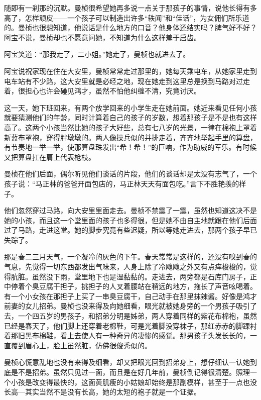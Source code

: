 \par 随即有一刹那的沉默。曼桢很希望她再多说一点关于那孩子的事情，说他长得有多高了，怎样顽皮——一个孩子可以制造出许多“轶闻”和“佳话”，为女佣们所乐道的。曼桢也很想知道，他说话是什么地方的口音？他身体还结实吗？脾气好不好？阿宝不说，曼桢却也不愿意问她，不知道为什么这样羞于启齿。
\par 阿宝笑道：“那我走了，二小姐。”她走了，曼桢也就进去了。
\par 阿宝说祝家现在住在大安里，曼桢常常走过那里的，她每天乘电车，从她家里走到电车站有不少路，这大安里就是必经之地，现在她走到这里总是换到马路对过走着，很担心也许会碰见鸿才，虽然不怕他纠缠不清，究竟讨厌。
\par 这一天，她下班回来，有两个放学回来的小学生走在她前面。她近来看见任何小孩就要猜测他们的年龄，同时计算着自己的孩子的岁数，想着那孩子是不是也有这样高了。这两个小孩当然比她的孩子大好些，总有七八岁的光景，一律在棉袍上罩着新蓝布罩袍，穿得胖墩墩的。两人像操兵似的并排走着，齐齐地举起手里的算盘，有节奏地一举一举，使那算盘珠发出“希！希！”的巨响，作为助威的军乐。有时候又把算盘扛在肩上代表枪枝。
\par 曼桢在他们后面，偶尔听见他们谈话的片段，他们的谈话却是太没有志气了，一个孩子说：“马正林的爸爸开面包店的，马正林天天有面包吃。”言下不胜艳羡的样子。
\par 他们忽然穿过马路，向大安里里面走去。曼桢不禁震了一震，虽然也知道这决不是她的小孩，而且这一个堂里面的孩子也多得很，但是她不由自主地就跟在他们后面过了马路，走进这堂。她的脚步究竟有些迟疑，所以等她走进去，那两个孩子早已失踪了。
\par 那是春二三月天气，一个凝冷的灰色的下午。春天常常是这样的，还没有嗅到春的气息，先觉得一切东西都发出气味来，人身上除了冷飕飕之外又有点痒梭梭的，觉得肮脏。虽然没下雨，堂里地下也是湿黏黏的。走进去，两旁都是石库门房子，正中停着个臭豆腐干担子，挑担子的人叉着腰站在稍远的地方，拖长了声音吆喝着。有一个小女孩在那担子上买了一串臭豆腐干，自己动手在那里抹辣酱。好像是鸿才前妻的女儿招弟。曼桢也没来得及向她细看，眼光就被她身旁的一个男孩子吸引了去，一个四五岁的男孩子，和招弟分明是姊弟，两人穿着同样的紫花布棉袍，虽然已经是春天了，他们脚上还穿着老棉鞋，可是光着脚没穿袜子，那红赤赤的脚踝衬着那旧黑布棉鞋，看上去使人有一种奇异的凄惨的感觉。那男孩子头发长长的，一直覆到眉心上，脸上虽然脏，仿佛很俊秀似的。
\par 曼桢心慌意乱地也没有来得及细看，却又把眼光回到招弟身上，想仔细认一认她到底是不是招弟。虽然只见过一面，而且是在好几年前，曼桢倒记得很清楚。照理一个小孩是改变得最快的，这面黄肌瘦的小姑娘却始终是那副模样，甚至于一点也没长高—其实当然不是没有长高，她的太短的袍子就是一个证据。
